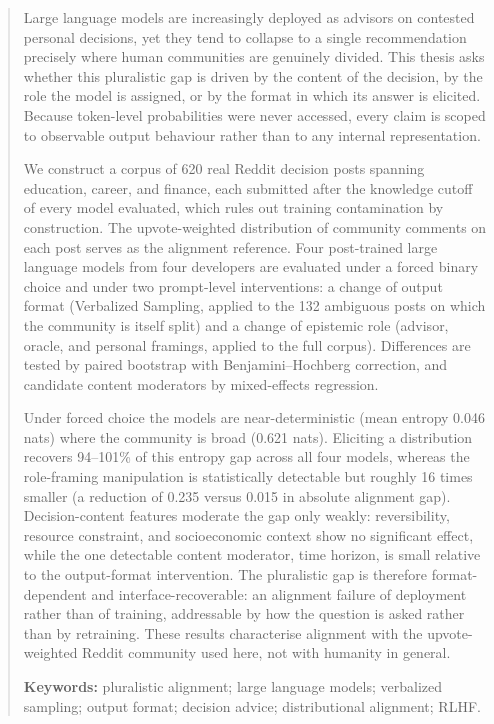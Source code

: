 \begin{abstract}
Large language models are increasingly deployed as advisors on contested
personal decisions, yet they tend to collapse to a single recommendation
precisely where human communities are genuinely divided. This thesis asks
whether this pluralistic gap is driven by the content of the decision, by
the role the model is assigned, or by the format in which its answer is
elicited. Because token-level probabilities were never accessed, every
claim is scoped to observable output behaviour rather than to any internal
representation.

We construct a corpus of 620 real Reddit decision posts spanning education,
career, and finance, each submitted after the knowledge cutoff of every
model evaluated, which rules out training contamination by construction.
The upvote-weighted distribution of community comments on each post serves
as the alignment reference. Four post-trained large language models from
four developers are evaluated under a forced binary choice and under two
prompt-level interventions: a change of output format (Verbalized Sampling,
applied to the 132 ambiguous posts on which the community is itself split)
and a change of epistemic role (advisor, oracle, and personal framings,
applied to the full corpus). Differences are tested by paired bootstrap
with Benjamini--Hochberg correction, and candidate content moderators by
mixed-effects regression.

Under forced choice the models are near-deterministic (mean entropy 0.046
nats) where the community is broad (0.621 nats). Eliciting a distribution
recovers 94--101\% of this entropy gap across all four models, whereas the
role-framing manipulation is statistically detectable but roughly 16 times
smaller (a reduction of 0.235 versus 0.015 in absolute alignment gap).
Decision-content features moderate the gap only weakly: reversibility,
resource constraint, and socioeconomic context show no significant effect,
while the one detectable content moderator, time horizon, is small relative
to the output-format intervention. The pluralistic gap is therefore format-dependent and
interface-recoverable: an alignment failure of deployment rather than of
training, addressable by how the question is asked rather than by
retraining. These results characterise alignment with the upvote-weighted
Reddit community used here, not with humanity in general.

\vspace{1em}
\noindent\textbf{Keywords:} pluralistic alignment; large language models;
verbalized sampling; output format; decision advice; distributional
alignment; RLHF.
\end{abstract}
